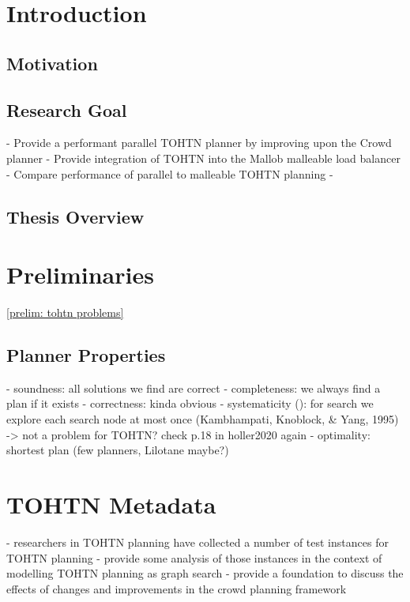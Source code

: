 \documentclass[enabledeprecatedfontcommands,12pt,a4paper,twoside]{scrartcl}
\numberwithin{equation}{section}
\begin{document}
\listoffigures
\listoftables
\listofalgorithms

\clearpage


\section{Introduction}
\subsection{Motivation}

\subsection{Research Goal}
- Provide a performant parallel TOHTN planner by improving upon the Crowd planner
- Provide integration of TOHTN into the Mallob malleable load balancer
- Compare performance of parallel to malleable TOHTN planning
- 
\subsection{Thesis Overview}

\section{Preliminaries}

\ref{prelim: tohtn problems}

\subsection{Planner Properties}
- soundness: all solutions we find are correct
- completeness: we always find a plan if it exists
- correctness: kinda obvious
- systematicity (\cite{holler2020htn}): for search we explore each search node at most once (Kambhampati, Knoblock, \& Yang, 1995) -> not a problem for TOHTN? check p.18 in holler2020 again
- optimality: shortest plan (few planners, Lilotane maybe?)







\section{TOHTN Metadata}
- researchers in TOHTN planning have collected a number of test instances for TOHTN planning
- provide some analysis of those instances in the context of modelling TOHTN planning as graph search
- provide a foundation to discuss the effects of changes and improvements in the crowd planning framework
\end{document}
